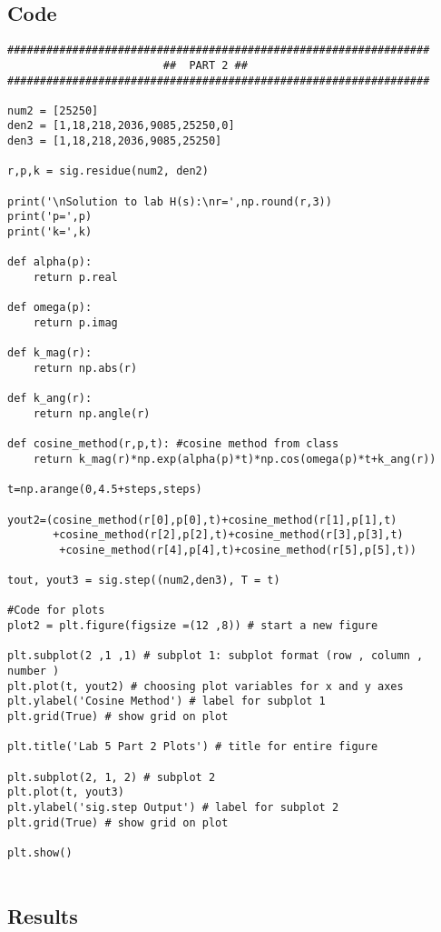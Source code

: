 \subsection{Code}
\begin{scriptsize}
\begin{lstlisting}
#################################################################
                        ##  PART 2 ##
#################################################################

num2 = [25250]
den2 = [1,18,218,2036,9085,25250,0]
den3 = [1,18,218,2036,9085,25250]

r,p,k = sig.residue(num2, den2)

print('\nSolution to lab H(s):\nr=',np.round(r,3))
print('p=',p)
print('k=',k)

def alpha(p):
    return p.real

def omega(p):
    return p.imag

def k_mag(r):
    return np.abs(r)

def k_ang(r):
    return np.angle(r)

def cosine_method(r,p,t): #cosine method from class
    return k_mag(r)*np.exp(alpha(p)*t)*np.cos(omega(p)*t+k_ang(r))

t=np.arange(0,4.5+steps,steps)

yout2=(cosine_method(r[0],p[0],t)+cosine_method(r[1],p[1],t)
       +cosine_method(r[2],p[2],t)+cosine_method(r[3],p[3],t)
        +cosine_method(r[4],p[4],t)+cosine_method(r[5],p[5],t))

tout, yout3 = sig.step((num2,den3), T = t)

#Code for plots
plot2 = plt.figure(figsize =(12 ,8)) # start a new figure

plt.subplot(2 ,1 ,1) # subplot 1: subplot format (row , column , number )
plt.plot(t, yout2) # choosing plot variables for x and y axes
plt.ylabel('Cosine Method') # label for subplot 1
plt.grid(True) # show grid on plot

plt.title('Lab 5 Part 2 Plots') # title for entire figure 

plt.subplot(2, 1, 2) # subplot 2
plt.plot(t, yout3)
plt.ylabel('sig.step Output') # label for subplot 2
plt.grid(True) # show grid on plot

plt.show()


\end{lstlisting}
\end{scriptsize}

\subsection{Results}


